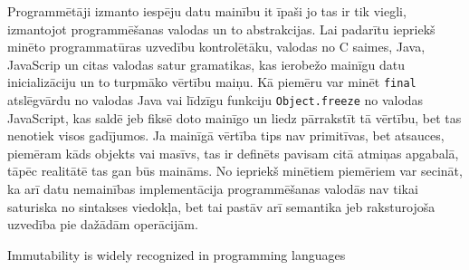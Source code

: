\documentclass[12pt,a4paper]{report}
\begin{document}
Programmētāji izmanto iespēju datu mainību it īpaši jo tas ir tik viegli, izmantojot programmēšanas valodas un to abstrakcijas. Lai padarītu iepriekš minēto programmatūras uzvedību kontrolētāku, valodas no C saimes, Java, JavaScrip un citas valodas satur gramatikas, kas ierobežo mainīgu datu inicializāciju un to turpmāko vērtību maiņu. Kā piemēru var minēt \texttt{final} atslēgvārdu no valodas Java vai līdzīgu funkciju \texttt{Object.freeze} no valodas JavaScript, kas saldē jeb fiksē doto mainīgo un liedz pārrakstīt tā vērtību, bet tas nenotiek visos gadījumos. Ja mainīgā vērtība tips nav primitīvas, bet atsauces, piemēram kāds objekts vai masīvs, tas ir definēts pavisam citā atmiņas apgabalā, tāpēc realitātē tas gan būs maināms. No iepriekš minētiem piemēriem var secināt, ka arī datu nemainības implementācija programmēšanas valodās nav tikai saturiska no sintakses viedokļa, bet tai pastāv arī semantika jeb raksturojoša uzvedība pie dažādām operācijām.

Immutability is widely recognized in programming languages \cite{lang-immutability}



\end{document}
